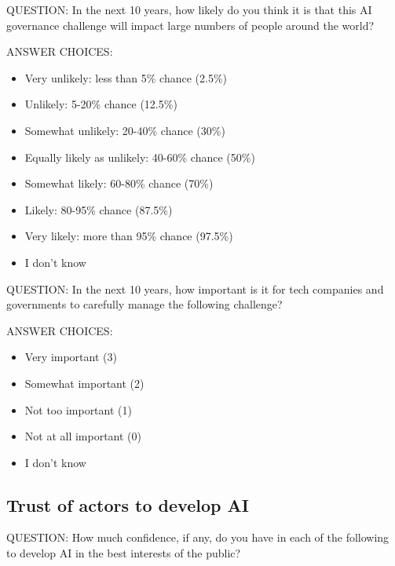 \documentclass{article}
\begin{document}
\noindent QUESTION: In the next 10 years, how likely do you think it is that this AI governance challenge will impact large numbers of people around the world?

\noindent ANSWER CHOICES:

\begin{itemize}
\item Very unlikely: less than 5\% chance (2.5\%)
\item Unlikely: 5-20\% chance (12.5\%)
\item Somewhat unlikely: 20-40\% chance (30\%)
\item Equally likely as unlikely: 40-60\% chance (50\%)
\item Somewhat likely: 60-80\% chance (70\%)
\item Likely: 80-95\% chance (87.5\%)
\item Very likely: more than 95\% chance (97.5\%)
\item I don’t know
\end{itemize}

\noindent QUESTION: In the next 10 years, how important is it for tech companies and governments to carefully manage the following challenge?

\noindent ANSWER CHOICES:

\begin{itemize}
\item Very important (3)
\item Somewhat important (2)
\item Not too important (1)
\item Not at all important (0)
\item I don’t know
\end{itemize}

\subsection{Trust of actors to develop AI}

\noindent QUESTION: How much confidence, if any, do you have in each of the following to develop AI in the best interests of the public?

\end{document}
